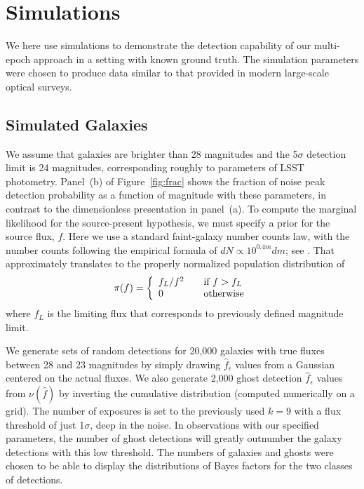 \documentclass[twocolumn]{emulateapj}
\newcommand{\eind}{\epsilon}  %
\newcommand{\flux}{f}
\newcommand{\fest}{\hat{\flux}}  %
\newcommand{\npd}{\nu}  %
\begin{document}
\section{Simulations}
\label{sec:disc}

\noindent
We here use simulations to demonstrate the detection capability of our multi-epoch approach in a setting with known ground truth.
The simulation parameters were chosen to produce data similar to that provided in modern large-scale optical surveys.


\subsection{Simulated Galaxies}
\noindent
We assume that galaxies are brighter than 28 magnitudes and the 5$\sigma$ detection limit is 24 magnitudes, corresponding roughly to parameters of LSST photometry.
%
Panel~(b) of Figure~\ref{fig:frac} shows the fraction of noise peak detection probability as a function of magnitude with these parameters, in contrast to the dimensionless presentation in panel~(a).
%
To compute the marginal likelihood for the source-present hypothesis, we must specify a prior for the source flux, $\flux$.
Here we use a standard faint-galaxy number counts law,
with the number counts following the empirical formula of 
\mbox{$dN\!\propto\!10^{0.4m}dm$}; see \citep{MT00-NumCounts}. 
That approximately translates to the properly normalized population distribution of
%
\begin{equation} 
\label{eq:ref3}
\pi(f) = \left\{\begin{array}{l l}
           f_L/f^2  & \quad \mbox{if\ $f > f_L$}\\
           0 & \quad \mbox{otherwise}
           \\ \end{array} \right.
\end{equation}
%
where $f_L$ is the limiting flux that corresponds to previously defined magnitude limit.

We generate sets of random detections for 20,000 galaxies with true fluxes between 28 and 23 magnitudes by simply drawing $\fest_\eind$ values from a Gaussian centered on the actual fluxes.
%
We also generate 2,000 ghost detection $\fest_\eind$ values from $\npd(\fest)$ by inverting the cumulative distribution (computed numerically on a grid).
%
The number of exposures is set to the previously used $k=9$ with a flux threshold of just 1$\sigma$, deep in the noise.
In observations with our specified parameters, the number of ghost detections will greatly outnumber the galaxy detections with this low threshold.
The numbers of galaxies and ghosts were chosen to be able to display the distributions of Bayes factors for the two classes of detections.
\end{document}
